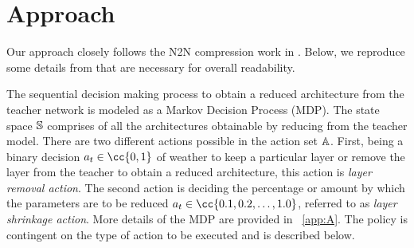 \documentclass[../main]{subfiles}
\begin{document}
\section{Approach}
Our approach closely follows the N2N compression work in \citet{ashok2017n2n}.
Below, we reproduce some details from \citet{ashok2017n2n} that are necessary for overall readability.

The sequential decision making process to obtain a reduced architecture from the teacher network is modeled as a Markov Decision Process (MDP).
The state space ${\mathbb{S}}$ comprises of all the architectures obtainable by reducing from the teacher model.
There are two different actions possible in the action set ${\mathbb{A}}$.
First, being a binary decision $a_{t} \in \cc{0,1}$ of weather to keep a particular layer or remove the layer from the teacher to obtain a reduced architecture, this action is \textit{layer removal action}.
The second action is deciding the percentage or amount by which the parameters are to be reduced $a_{t} \in \cc{0.1, 0.2, \dotsc, 1.0}$, referred to as \textit{layer shrinkage action}.
More details of the MDP are provided in \appendixname~\ref{app:A}.
The policy is contingent on the type of action to be executed and is described below.
\end{document}
